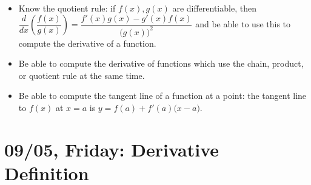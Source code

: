 \documentclass[11pt,letterpaper]{article}
\begin{document}
\begin{itemize}
\item Know the quotient rule: if $f(x), g(x)$ are differentiable, then $\dfrac{d}{dx} \left( \dfrac{f(x)}{g(x)} \right)= \dfrac{f'(x) g(x) - g'(x) f(x)}{\big( g(x) \big)^2}$ and be able to use this to compute the derivative of a function. 

\item Be able to compute the derivative of functions which use the chain, product, or quotient rule at the same time. 

\item Be able to compute the tangent line of a function at a point: the tangent line to $f(x)$ at $x= a$ is $y= f(a) + f'(a) \big(x - a \big)$. 
\end{itemize}

\newpage
\section*{09/05, Friday: Derivative Definition\label{09-05}}
\end{document}
